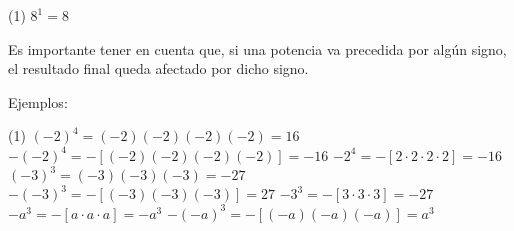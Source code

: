 \begin{ejemplos1bullet}(1)
  \task $8^1 = 8$
\end{ejemplos1bullet}



Es importante tener en cuenta que, si una potencia va precedida por
algún signo, el resultado final queda afectado por dicho signo.  

Ejemplos:

\begin{ejemplos1bullet}(1)
  \task $(-2)^4 = (-2)(-2)(-2)(-2) = 16$
  \task $-(-2)^4 = -[(-2)(-2)(-2)(-2)] = -16$
  \task $-2^4 = -[2 \cdot 2 \cdot 2 \cdot 2] = -16$
  \task $(-3)^3 = (-3)(-3)(-3) = -27$
  \task $-(-3)^3 = -[(-3)(-3)(-3)] = 27$
  \task $-3^3 = -[3 \cdot 3 \cdot 3] = -27$
  \task $-a^3 = -[a \cdot a \cdot a] = -a^3$
  \task $-(-a)^3 = -[(-a)(-a)(-a)] = a^3$
\end{ejemplos1bullet}









